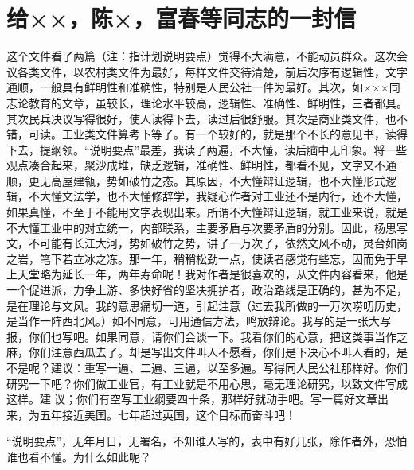 \section[给××，陈×，富春等同志的一封信（一九五八年九月二日）]{给××，陈×，富春等同志的一封信}


这个文件看了两篇（注：指计划说明要点）觉得不大满意，不能动员群众。这次会议各类文件，以农村类文件为最好，每样文件交待清楚，前后次序有逻辑性，文字通顺，一般具有鲜明性和准确性，特别是人民公社一件为最好。其次，如×××同志论教育的文章，虽较长，理论水平较高，逻辑性、准确性、鲜明性，三者都具。其次民兵决议写得很好，使人读得下去，读过后很舒服。其次是商业类文件，也不错，可读。工业类文件算考下等了。有一个较好的，就是那个不长的意见书，读得下去，提纲领。“说明要点”最差，我读了两遍，不大懂，读后脑中无印象。将一些观点凑合起来，聚沙成堆，缺乏逻辑，准确性、鲜明性，都看不见，文字又不通顺，更无高屋建瓴，势如破竹之态。其原因，不大懂辩证逻辑，也不大懂形式逻辑，不大懂文法学，也不大懂修辞学，我疑心作者对工业还不是内行，还不大懂，如果真懂，不至于不能用文字表现出来。所谓不大懂辩证逻辑，就工业来说，就是不大懂工业中的对立统一，内部联系，主要矛盾与次要矛盾的分别。因此，杨思写文，不可能有长江大河，势如破竹之势，讲了一万次了，依然文风不动，灵台如岗之岩，笔下若立冰之冻。那一年，稍稍松劲一点，使读者感觉有些忘，因而免于早上天堂略为延长一年，两年寿命呢！我对作者是很喜欢的，从文件内容看来，他是一个促进派，力争上游、多快好省的坚决拥护者，政治路线是正确的，甚为不足，是在理论与文风。我的意思痛切一道，引起注意（过去我所做的一万次唠叨历史，是当作一阵西北风。）如不同意，可用通信方法，鸣放辩论。我写的是一张大写报，你们也写吧。如果同意，请你们会谈一下。我看你们的心意，把这类事当作芝麻，你们注意西瓜去了。却是写出文件叫人不愿看，你们是下决心不叫人看的，是不是呢？建议：重写一遍、二遍、三遍，以至多遍。写得同人民公社那样好。你们研究一下吧？你们做工业官，有工业就是不用心思，毫无理论研究，以致文件写成这样。建议；你们有空写工业纲要四十条，那样好就动手吧。写一篇好文章出来，为五年接近美国。七年超过英国，这个目标而奋斗吧！

“说明要点”，无年月日，无署名，不知谁人写的，表中有好几张，除作者外，恐怕谁也看不懂。为什么如此呢？
